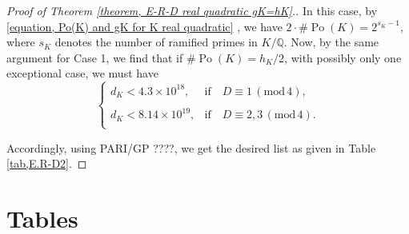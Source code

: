 \documentclass[12pt]{amsart}
\theoremstyle{definition}
\numberwithin{equation}{section}
\DeclareMathOperator{\Po}{Po}
\begin{document}
\begin{proof}[Proof of Theorem \ref{theorem, E-R-D real quadratic gK=hK}.]
	In this case, by  \eqref{equation, Po(K) and gK for K real quadratic}
, we have $2\cdot\# \Po(K)=2^{s_K-1}$, where $s_K$ denotes the number of ramified primes in $K/\mathbb{Q}$. Now, by the same argument for Case 1, 
	we find that if $\# \Po(K)=h_K/2$, with possibly only one exceptional case, we must have
	\begin{equation*} 
		\left\{
		\begin{array}{ll}
			d_K < 4.3\times 10^{18}, & \text{if} \quad D \equiv 1 \, (\mathrm{mod}\, 4),\\
			& \\
			d_K < 8.14 \times 10^{19},  & \text{if} \quad D \equiv 2,3 \, (\mathrm{mod}\, 4).\\
		\end{array}
		\right.
	\end{equation*}
	
Accordingly, using PARI/GP ????, we get the desired list as given in Table \ref{tab,E.R-D2}.
\fi
\end{proof}


\newpage

\section{Tables}\label{six}
\end{document}
